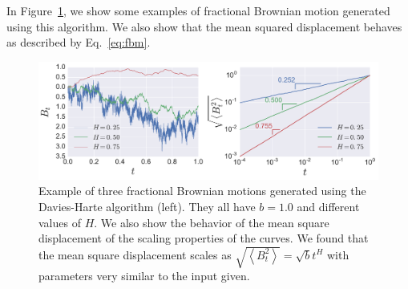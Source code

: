 In Figure~\ref{fig:fbm}, we show some examples of fractional Brownian motion
generated using this algorithm. We also show that the mean squared displacement
behaves as described by Eq.~\ref{eq:fbm}.

\begin{figure}
\begin{center}
    \includegraphics[scale=0.45]{chapters/ch6-asle/figs/fbm}
\end{center}
\caption{Example of three fractional Brownian motions generated using the
    Davies-Harte algorithm (left). They all have $b=1.0$ and different values
    of $H$. We also show the behavior of the mean square displacement of the
    scaling properties of the curves. We found that the mean square displacement
    scales as $\sqrt{\left\langle B_t^2\right\rangle}=\sqrt{b}t^H$ with
    parameters very similar to the input given.}
\label{fig:fbm}
\end{figure}

